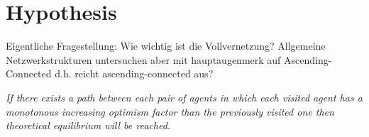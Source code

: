 \documentclass[Bachelorarbeit.tex]{subfiles}
\begin{document}
\chapter{Hypothesis}
\label{ch:hypothesis}

Eigentliche Fragestellung: Wie wichtig ist die Vollvernetzung?
	Allgemeine Netzwerkstrukturen untersuchen aber mit hauptaugenmerk auf Ascending-Connected d.h. reicht ascending-connected aus?

\begin{center}
\textit{If there exists a path between each pair of agents in which each visited agent has a monotonous increasing optimism factor than the previously visited one then theoretical equilibrium will be reached.}
\end{center}
\end{document}
